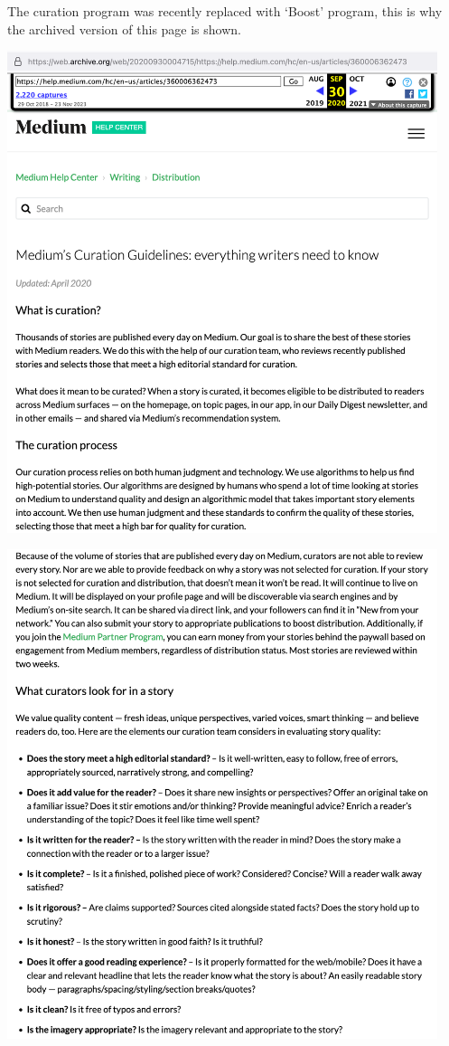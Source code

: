 
The curation program was recently replaced with `Boost' program,
this is why the archived version of this page is shown.

\begin{center}
    \includegraphics[width=34em]{medium-help-curation-p1}
\end{center}
\WillContinue
\pagebreak

\Continuing
\begin{center}
    \includegraphics[width=34em]{medium-help-curation-p2}
\end{center}

\pagebreak
